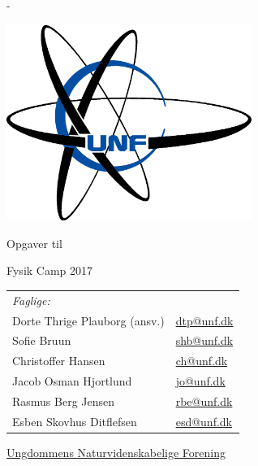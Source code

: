 \begin{titlingpage}
  \newlength{\frontpagecorrection}
  \calccentering{\frontpagecorrection}

  \begin{adjustwidth*}{\frontpagecorrection-2cm}{-\frontpagecorrection-2cm}
    
  \centering

  \vfill

  \includegraphics[width=8cm]{old/Unflogo.eps}
 
  \scshape
    
  \fontsize{24pt}{28pt}\selectfont

  \bigskip

  \vspace{0.5cm}

  Opgaver til\par
    
  Fysik Camp 2017\par

  \vspace{1cm}
  
  \begin{table}[h!]
    \centering
    \begin{tabular}{ll}
      \textit{Faglige:} & \\
      Dorte Thrige Plauborg (ansv.)       & \href{mailto:dtp@unf.dk}{dtp@unf.dk} \\
      Sofie Bruun          & \href{mailto:shb@unf.dk}{shb@unf.dk} \\
      Christoffer Hansen         & \href{mailto:ch@unf.dk}{ch@unf.dk} \\
      Jacob Osman Hjortlund        & \href{mailto:jo@unf.dk}{jo@unf.dk} \\
      Rasmus Berg Jensen                  & \href{mailto:rbe@unf.dk}{rbe@unf.dk} \\
      Esben Skovhus Ditflefsen           & \href{mailto:esd@unf.dk}{esd@unf.dk} \\
    \end{tabular}
  \end{table}

  \vfill
    
  \fontsize{14pt}{18pt}\selectfont
  \href{http://www.unf.dk/}{Ungdommens Naturvidenskabelige
    Forening}\par
  \end{adjustwidth*}
\end{titlingpage}

